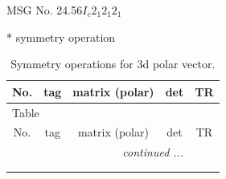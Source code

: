 \documentclass[fleqn,8pt]{jsarticle}
\begin{document}
\setcounter{MaxMatrixCols}{32}

\renewcommand{\tablename}{Table~}
\renewcommand{\figurename}{Figure~}
\begin{center}
\LARGE
MSG No. 24.56\quad$I_{c}2_{1}2_{1}2_{1}$
\end{center}
* symmetry operation
\renewcommand{\arraystretch}{1.3}
\begin{longtable}{ccccc}
\caption{Symmetry operations for 3d polar vector.}
 \\
 \hline \hline
No. & tag & matrix (polar) & det & TR \\ \hline \endfirsthead

\multicolumn{4}{l}{\tablename\ \thetable{}} \\
 \hline \hline
No. & tag & matrix (polar) & det & TR \\ \hline \endhead

 \hline \hline
\multicolumn{4}{r}{\footnotesize\it continued ...} \\ \endfoot

 \hline \hline
\multicolumn{4}{r}{} \\ \endlastfoot


\end{longtable}
\end{document}
